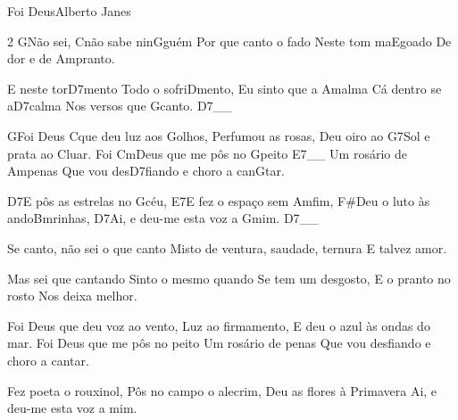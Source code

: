 \begin{musica}{Foi Deus}{Alberto Janes}{}
\begin{multicols}{2}
\ac{G}{Não} sei, \ac{C}{não} sabe nin\ac{G}{guém}
Por que canto o fado
Neste tom ma\ac{E}{goa}do
De dor e de \ac{Am}{pran}to.

E neste tor\ac{D7}{men}to
Todo o sofri\ac{D}{men}to,
Eu sinto que a \ac{Am}{a}lma
Cá dentro se a\ac{D7}{cal}ma
Nos versos que \ac{G}{can}to. \ac{D7}{}__

\ac{G}{Foi} Deus \ac{C}{que} deu luz aos \ac{G}{o}lhos,
Perfumou as rosas,
Deu oiro ao \ac{G7}{Sol} e prata ao \ac{C}{luar}.
Foi \ac{Cm}{Deus} que me pôs no \ac{G}{pei}to \ac{E7}{}__
Um rosário de \ac{Am}{pe}nas
Que vou des\ac{D7}{fian}do e choro a can\ac{G}{tar}.

\ac{D7}{E} pôs as estrelas no \ac{G}{céu},
\ac{E7}{E} fez o espaço sem \ac{Am}{fim},
\ac{F#}{Deu} o luto às ando\ac{Bm}{ri}nhas,
\ac{D7}{Ai}, e deu-me esta voz a \ac{G}{mim}. \ac{D7}{}__

Se canto, não sei o que canto
Misto de ventura, saudade, ternura
E talvez amor.

Mas sei que cantando
Sinto o mesmo quando
Se tem um desgosto,
E o pranto no rosto
Nos deixa melhor.

Foi Deus que deu voz ao vento,
Luz ao firmamento,
E deu o azul às ondas do mar.
Foi Deus que me pôs no peito
Um rosário de penas
Que vou desfiando e choro a cantar.

Fez poeta o rouxinol,
Pôs no campo o alecrim,
Deu as flores à Primavera
Ai, e deu-me esta voz a mim.
\end{multicols}

\end{musica}
